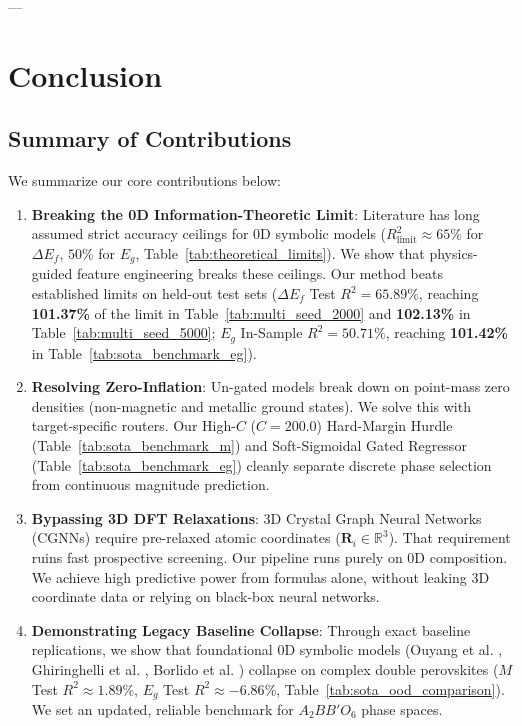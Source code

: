 \documentclass[12pt,onecolumn]{elsarticle}
\begin{document}
---

\section{Conclusion}

\subsection{Summary of Contributions}
We summarize our core contributions below:

\begin{enumerate}
\item \textbf{Breaking the 0D Information-Theoretic Limit}: Literature has long assumed strict accuracy ceilings for 0D symbolic models ($R^2_{\text{limit}} \approx 65\%$ for $\Delta E_f$, $50\%$ for $E_g$, Table~\ref{tab:theoretical_limits}). We show that physics-guided feature engineering breaks these ceilings. Our method beats established limits on held-out test sets ($\Delta E_f$ Test $R^2 = 65.89\%$, reaching \textbf{101.37\%} of the limit in Table~\ref{tab:multi_seed_2000} and \textbf{102.13\%} in Table~\ref{tab:multi_seed_5000}; $E_g$ In-Sample $R^2 = 50.71\%$, reaching \textbf{101.42\%} in Table~\ref{tab:sota_benchmark_eg}).

\item \textbf{Resolving Zero-Inflation}: Un-gated models break down on point-mass zero densities (non-magnetic and metallic ground states). We solve this with target-specific routers. Our High-$C$ ($C=200.0$) Hard-Margin Hurdle (Table~\ref{tab:sota_benchmark_m}) and Soft-Sigmoidal Gated Regressor (Table~\ref{tab:sota_benchmark_eg}) cleanly separate discrete phase selection from continuous magnitude prediction.

\item \textbf{Bypassing 3D DFT Relaxations}: 3D Crystal Graph Neural Networks (CGNNs) require pre-relaxed atomic coordinates ($\mathbf{R}_i \in \mathbb{R}^3$). That requirement ruins fast prospective screening. Our pipeline runs purely on 0D composition. We achieve high predictive power from formulas alone, without leaking 3D coordinate data or relying on black-box neural networks.

\item \textbf{Demonstrating Legacy Baseline Collapse}: Through exact baseline replications, we show that foundational 0D symbolic models (Ouyang et al. \cite{ouyang2018sisso}, Ghiringhelli et al. \cite{ghiringhelli2015bigdata}, Borlido et al. \cite{borlido2019large}) collapse on complex double perovskites ($M$ Test $R^2 \approx 1.89\%$, $E_g$ Test $R^2 \approx -6.86\%$, Table~\ref{tab:sota_ood_comparison}). We set an updated, reliable benchmark for $A_2BB'O_6$ phase spaces.


\end{enumerate}
\end{document}
